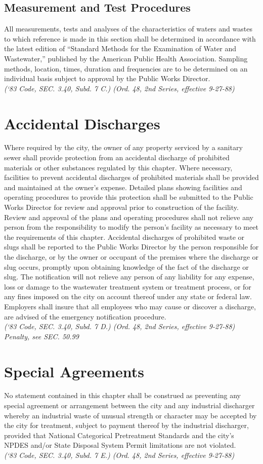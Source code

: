 \subsection{Measurement and Test Procedures}
All measurements, tests and analyses of the characteristics of waters and wastes to which reference is made in this section shall be determined in accordance with the latest edition of “Standard Methods for the Examination of Water and Wastewater,” published by the American Public Health Association.  Sampling methods, location, times, duration and frequencies are to be determined on an individual basis subject to approval by the Public Works Director.\\
\emph{(‘83 Code, SEC. 3.40, Subd. 7 C.) (Ord. 48, 2nd Series, effective 9-27-88)}
\section{Accidental Discharges}
Where required by the city, the owner of any property serviced by a sanitary sewer shall provide protection from an accidental discharge of prohibited materials or other substances regulated by this chapter.  Where necessary, facilities to prevent accidental discharges of prohibited materials shall be provided and maintained at the owner’s expense.  Detailed plans showing facilities and operating procedures to provide this protection shall be submitted to the Public Works Director for review and approval prior to construction of the facility.  Review and approval of the plans and operating procedures shall not relieve any person from the responsibility to modify the person’s facility as necessary to meet the requirements of this chapter.  Accidental discharges of prohibited waste or slugs shall be reported to the Public Works Director by the person responsible for the discharge, or by the owner or occupant of the premises where the discharge or slug occurs, promptly upon obtaining knowledge of the fact of the discharge or slug.  The notification will not relieve any person of any liability for any expense, loss or damage to the wastewater treatment system or treatment process, or for any fines imposed on the city on account thereof under any state or federal law.  Employers shall insure that all employees who may cause or discover a discharge, are advised of the emergency notification procedure.\\
\emph{(‘83 Code, SEC. 3.40, Subd. 7 D.) (Ord. 48, 2nd Series, effective 9-27-88)}\\
\emph{Penalty, see SEC. 50.99}
\section{Special Agreements}
No statement contained in this chapter shall be construed as preventing any special agreement or arrangement between the city and any industrial discharger whereby an industrial waste of unusual strength or character may be accepted by the city for treatment, subject to payment thereof by the industrial discharger, provided that National Categorical Pretreatment Standards and the city’s NPDES and/or State Disposal System Permit limitations are not violated.\\
\emph{(‘83 Code, SEC. 3.40, Subd. 7 E.) (Ord. 48, 2nd Series, effective 9-27-88)}
